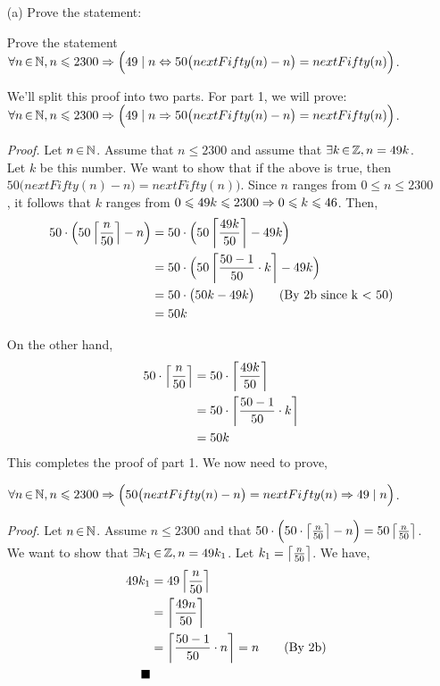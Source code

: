 \documentclass[12pt]{article}
\newcommand{\qed}{\tag*{$\blacksquare$}}
\begin{document}
\begin{enumerate}
\item[(a)] Prove the statement:

Prove the statement $\forall n \,{\in}\, \mathbb N, n \leqslant 2300 \Rightarrow \Big( 49 \mid n \Leftrightarrow 50 \big( nextFifty(n) - n \big) = nextFifty(n) \Big)$.

We'll split this proof into two parts. For part 1, we will prove:
$\forall n \,{\in}\, \mathbb N, n \leqslant 2300 \Rightarrow \Big( 49 \mid n \Rightarrow 50 \big( nextFifty(n) - n \big) = nextFifty(n) \Big)$.

\emph{Proof.} Let $n \,{\in}\, \mathbb N$. Assume that $n \leqslant 2300$ and assume that $\exists k \,{\in}\, \mathbb Z, n = 49k$. Let $k$ be this number. We want to show that if the above is true, then $50 \big( nextFifty(n) - n \big) = nextFifty(n) \Big)$. Since $n$ ranges from $0 \leqslant n \leqslant 2300$, it follows that $k$ ranges from $0 \leqslant 49k \leqslant 2300 \Rightarrow 0 \leqslant k \leqslant 46$. Then,
\begin{align*}
50 \cdot \Big( 50 \left \lceil \frac{n}{50} \right \rceil - n \Big) &= 50 \cdot \Big( 50 \left \lceil \frac{49k}{50} \right \rceil - 49k \Big) \\
&= 50 \cdot \Big( 50 \left \lceil \frac{50-1}{50} \cdot k \right \rceil - 49k \Big) \\
&= 50 \cdot \big( 50k - 49k \big) \tag{By 2b since k < 50} \\
&= 50k
\end{align*}

On the other hand,
\begin{align*}
50 \cdot \left \lceil \frac{n}{50} \right \rceil &= 50 \cdot \left \lceil \frac{49k}{50} \right \rceil \\
&= 50 \cdot \left \lceil \frac{50-1}{50} \cdot k \right \rceil \\
&= 50k
\end{align*}
This completes the proof of part 1. We now need to prove,

$\forall n \,{\in}\, \mathbb N, n \leqslant 2300 \Rightarrow \Big( 50 \big( nextFifty(n) - n \big) = nextFifty(n) \Rightarrow 49 \mid n \Big)$.

\emph{Proof.} Let $n \,{\in}\, \mathbb N$. Assume $n \leqslant 2300$ and that $50 \cdot \Big( 50 \cdot \left \lceil \frac{n}{50} \right \rceil - n \Big) = 50 \left \lceil \frac{n}{50} \right \rceil$. We want to show that $\exists k_1 \,{\in}\, \mathbb Z, n = 49 k_1$. Let $k_1 = \left \lceil \frac{n}{50} \right \rceil$. We have,
\begin{align*}
49k_1 &= 49 \ceil{\frac{n}{50}} \\
&= \ceil{\frac{49n}{50}} \\
&= \ceil{\frac{50 - 1}{50} \cdot n} = n \tag{By 2b} \\
\qed
\end{align*}


\end{enumerate}
\end{document}
